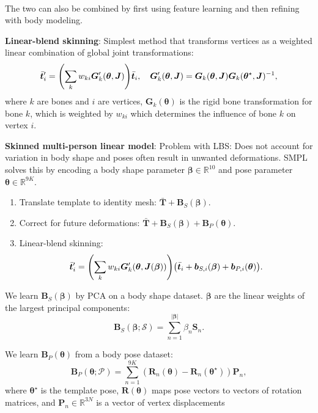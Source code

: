 \documentclass{article}
\newcommand{\lft}{\mathopen{}\mathclose\bgroup\left}
\newcommand{\rgt}{\aftergroup\egroup\right}
\newcommand{\R}{\mathbb{R}}
\renewcommand{\vec}[1]{\bm{#1}}
\newcommand{\mat}[1]{\bm{#1}}
\newenvironment{topic}[1]
{\textbf{\sffamily \colorbox{black}{\rlap{\textbf{\textcolor{white}{#1}}}\hspace{\linewidth}\hspace{-2\fboxsep}}} \\ \vspace{0.2cm}}
{}
\begin{document}
\begin{multicols*}{2}
\begin{topic}{Parametric human body models}
        The two can also be combined by first using feature learning and then refining with body modeling.

        \textbf{Linear-blend skinning}: Simplest method that transforms vertices as a weighted linear combination of global joint transformations: \[
            \bar{\vec{t}}_i' = \lft( \sum_{k} w_{ki} \mat{G}'_k(\vec{\theta}, \mat{J}) \rgt) \bar{\vec{t}}_i, \quad \mat{G}'_k(\vec{\theta}, \mat{J}) = \mat{G}_k(\vec{\theta}, \mat{J}) \mat{G}_k(\vec{\theta}^\star, \mat{J})^{-1},
        \]
        where $k$ are bones and $i$ are vertices, $\mat{G}_k(\vec{\theta})$ is the rigid bone
        transformation for bone $k$, which is weighted by $w_{ki}$ which determines the influence of bone
        $k$ on vertex $i$.

        \textbf{Skinned multi-person linear model}: Problem with LBS: Does not account for variation
        in body shape and poses often result in unwanted deformations. SMPL solves this by encoding a
        body shape parameter $\vec{\beta} \in \R^{10}$ and pose parameter $\vec{\theta} \in \R^{9K}$.

        \begin{enumerate}
            \item Translate template to identity mesh: $\bar{\mat{T}} + \mat{B}_S(\vec{\beta})$.
            \item Correct for future deformations: $\bar{\mat{T}} + \mat{B}_S(\vec{\beta}) +
                      \mat{B}_P(\vec{\theta})$.
            \item Linear-blend skinning: \[
                      \bar{\vec{t}}_i' = \lft( \sum_{k} w_{ki} \mat{G}'_k(\vec{\theta}, \mat{J}(\vec{\beta})) \rgt) \lft(\bar{\vec{t}}_i + \vec{b}_{S,i}(\vec{\beta}) + \vec{b}_{P,i}(\vec{\theta})\rgt).
                  \]
        \end{enumerate}

        We learn $\mat{B}_S(\vec{\beta})$ by PCA on a body shape dataset. $\vec{\beta}$ are the linear
        weights of the largest principal components: \[
            \mat{B}_S(\vec{\beta}; \mathcal{S}) = \sum_{n=1}^{|\vec{\beta}|} \beta_n \mat{S}_n.
        \]

        We learn $\mat{B}_P(\vec{\theta})$ from a body pose dataset: \[
            \mat{B}_P(\vec{\theta}; \mathcal{P}) = \sum_{n=1}^{9K} (\mat{R}_n(\vec{\theta}) - \mat{R}_n(\vec{\theta}^\star)) \mat{P}_n,
        \]
        where $\vec{\theta}^\star$ is the template pose, $\mat{R}(\vec{\theta})$ maps pose vectors to
        vectors of rotation matrices, and $\mat{P}_n \in \R^{3N}$ is a vector of vertex displacements


\end{topic}
\end{multicols*}
\end{document}
